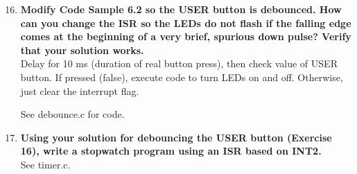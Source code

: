 \documentclass{article}
\begin{document}
\begin{enumerate}[label=\textbf{\arabic*})]
    \setcounter{enumi}{15}
    \item \textbf{Modify Code Sample 6.2 so the USER button is debounced. How can you change the
    ISR so the LEDs do not flash if the falling edge comes at the beginning of a very brief,
    spurious down pulse? Verify that your solution works.} \\

    Delay for 10 ms (duration of real button press), then check value of USER button. If pressed (false), 
    execute code to turn LEDs on and off. Otherwise, just clear the interrupt flag.

    See debounce.c for code.

    \item \textbf{Using your solution for debouncing the USER button (Exercise 16), write a stopwatch
    program using an ISR based on INT2.} \\

    See timer.c.

\end{enumerate}
\end{document}
